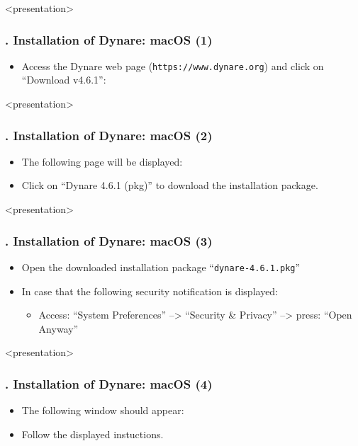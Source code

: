 \documentclass[11pt,aspectratio=169]{beamer}
\begin{document}
\begin{frame}<presentation>
	\frametitle{{\thesection.\thesubsection} Installation of Dynare: macOS (1)}
	\begin{itemize}
		\item Access the Dynare web page (\texttt{https://www.dynare.org}) and click on ``Download v4.6.1'':
		\begin{figure}
		\end{figure}
	\end{itemize}
\end{frame}
\begin{frame}<presentation>
	\frametitle{{\thesection.\thesubsection} Installation of Dynare: macOS (2)}
	\begin{itemize}
		\item The following page will be displayed:
		\begin{figure}
		\end{figure}
	\item Click on ``Dynare 4.6.1 (pkg)'' to download the installation package.
	\end{itemize}
\end{frame}
\begin{frame}<presentation>
	\frametitle{{\thesection.\thesubsection} Installation of Dynare: macOS (3)}
	\begin{itemize}
		\item Open the downloaded installation package ``\texttt{dynare-4.6.1.pkg}''
		\item In case that the following security notification is displayed:
		\begin{figure}
		\end{figure}
		\begin{itemize}
			\item Access: ``System Preferences'' --> ``Security \& Privacy'' --> press: ``Open Anyway''
		\end{itemize}
	\end{itemize}
\end{frame}
\begin{frame}<presentation>
	\frametitle{{\thesection.\thesubsection} Installation of Dynare: macOS (4)}
	\begin{itemize}
		\item The following window should appear:
		\begin{figure}
		\end{figure}
		\item Follow the displayed instuctions.
	\end{itemize}
\end{frame}
\end{document}
